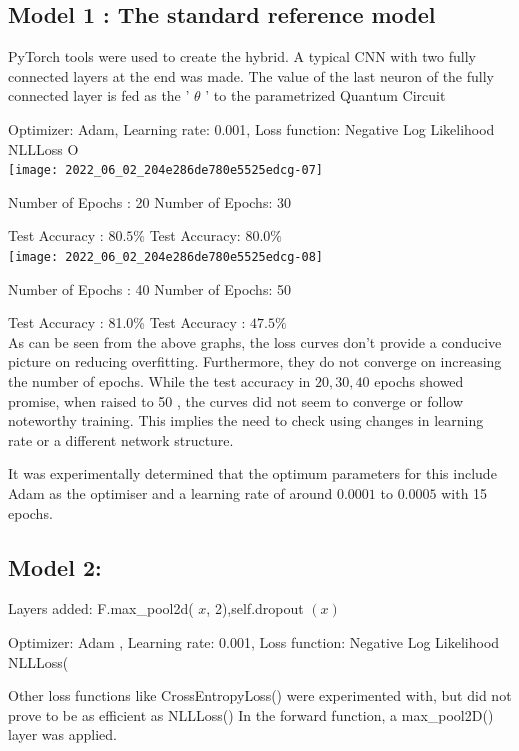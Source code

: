 \documentclass[10pt]{article}
\begin{document}
\subsection{Model 1 : The standard reference model}
PyTorch tools were used to create the hybrid. A typical CNN with two fully connected layers at the end was made. The value of the last neuron of the fully connected layer is fed as the ' $\theta$ ' to the parametrized Quantum Circuit

Optimizer: Adam, Learning rate: 0.001, Loss function: Negative Log Likelihood NLLLoss O\\

\texttt{[image: 2022\_06\_02\_204e286de780e5525edcg-07]}

Number of Epochs : 20    \hspace{19em}  Number of Epochs: 30

Test Accuracy : $80.5 \%$   \hspace{19em}  Test Accuracy: $80.0 \%$\\

\texttt{[image: 2022\_06\_02\_204e286de780e5525edcg-08]}

Number of Epochs : 40  \hspace{19em}  Number of Epochs: 50

Test Accuracy : 81.0\%   \hspace{19em} Test Accuracy : $47.5 \%$ \\

As can be seen from the above graphs, the loss curves don't provide a conducive picture on reducing overfitting. Furthermore, they do not converge on increasing the number of epochs. While the test accuracy in $20,30,40$ epochs showed promise, when raised to 50 , the curves did not seem to converge or follow noteworthy training. This implies the need to check using changes in learning rate or a different network structure.

It was experimentally determined that the optimum parameters for this include Adam as the optimiser and a learning rate of around $0.0001$ to $0.0005$ with 15 epochs.
\setlength{\parskip}{1pt}
\subsection{Model 2:}
Layers added: F.max\_pool2d( $x$, 2),self.dropout $(x)$

Optimizer: Adam , Learning rate: 0.001, Loss function: Negative Log Likelihood NLLLoss(

Other loss functions like CrossEntropyLoss() were experimented with, but did not prove to be as efficient as NLLLoss() In the forward function, a max\_pool2D() layer was applied.
\end{document}
